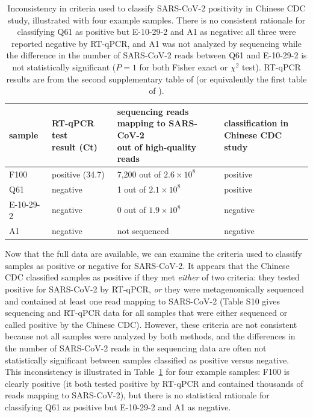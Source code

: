 \documentclass[9pt,twocolumn,twoside]{gsajnl_modified}
\begin{document}
\begin{table}
\caption{
Inconsistency in criteria used to classify SARS-CoV-2 positivity in Chinese CDC study, illustrated with four example samples.
There is no consistent rationale for classifying Q61 as positive but E-10-29-2 and A1 as negative: all three were reported negative by RT-qPCR, and A1 was not analyzed by sequencing while the difference in the number of SARS-CoV-2 reads between Q61 and E-10-29-2 is not statistically significant ($P = 1$ for both Fisher exact or $\chi^2$ test).
RT-qPCR results are from the second supplementary table of \citet{liu2023surveillance} (or equivalently the first table of \citet{liu2022surveillance}).
\label{tab:consistency}
}
{\footnotesize
\setlength{\tabcolsep}{5pt}
\renewcommand{\arraystretch}{1.3}
\begin{tabular}{llll}
\toprule
sample & \makecell[l]{RT-qPCR test \\ result (Ct)} & \makecell[l]{sequencing reads \\ mapping to SARS-CoV-2 \\ out of high-quality reads} & \makecell[l]{classification in \\ Chinese CDC study} \\
\midrule
F100 & positive (34.7) & 7,200 out of $2.6 \times 10^8$ & positive \\
Q61 & negative & 1 out of $2.1 \times 10^8$ & positive \\
E-10-29-2 & negative & 0 out of $1.9 \times 10^8$ & negative \\
A1 & negative & not sequenced & negative \\
\bottomrule
\end{tabular}
}
\end{table}

Now that the full data are available, we can examine the criteria used to classify samples as positive or negative for SARS-CoV-2.
It appears that the Chinese CDC classified samples as positive if they met \emph{either} of two criteria: they tested positive for SARS-CoV-2 by RT-qPCR, \emph{or} they were metagenomically sequenced and contained at least one read mapping to SARS-CoV-2 (Table S10 gives sequencing and RT-qPCR data for all samples that were either sequenced or called positive by the Chinese CDC).
However, these criteria are not consistent because not all samples were analyzed by both methods, and the differences in the number of SARS-CoV-2 reads in the sequencing data are often not statistically significant between samples classified as positive versus negative.
This inconsistency is illustrated in Table~\ref{tab:consistency} for four example samples: F100 is clearly positive (it both tested positive by RT-qPCR and contained thousands of reads mapping to SARS-CoV-2), but there is no statistical rationale for classifying Q61 as positive but E-10-29-2 and A1 as negative.
\end{document}
